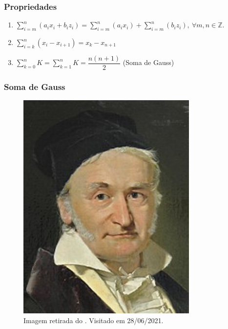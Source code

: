 \documentclass[12pt]{beamer}
\newcounter{saveenumi}
\newcommand{\seti}{\setcounter{saveenumi}{\value{enumi}}}
\newcommand{\conti}{\setcounter{enumi}{\value{saveenumi}}}
\begin{document}
\begin{frame}{}
\frametitle{Propriedades}
\begin{block}{}
\justifying
\begin{enumerate}
    \conti
\item ${\displaystyle \sum_{i=m}^{n}(a_{i}x_{i}+b_{i}z_{i})=\sum_{i=m}^{n}(a_{i}x_{i})+
\sum_{i=m}^{n}(b_{i}z_{i}),\ \forall m,n\in \mathds{Z}.}$ 
\item ${\displaystyle \sum_{i=k}^{n}(x_{i}-x_{i+1})=x_{k}-x_{n+1}}$  
\item ${\displaystyle \sum_{k=0}^{n}K=\sum_{k=1}^{n}K=\dfrac{n(n+1)}{2}}$ (Soma de Gauss) 
    \seti
\end{enumerate}
\end{block}
\end{frame}

\begin{frame}{}
\frametitle{Soma de Gauss}
\begin{block}{}
\begin{minipage}{0.4\textwidth}
\begin{figure}[H]
    \centering
\caption{Imagem retirada do \citet{wikiGauss}. Visitado em 28/06/2021.}
    \includegraphics[width=0.8\textwidth]{figs/Gauss.jpg}
  \end{figure}
\end{minipage}\hfill

\end{block}
\end{frame}
\end{document}
